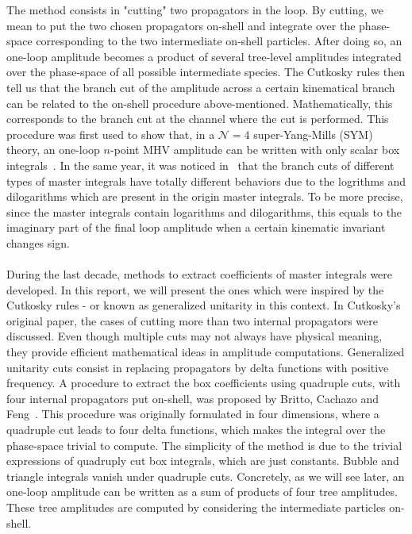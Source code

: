 The method consists in "cutting" two propagators in the loop.
By cutting, we mean to put the two chosen propagators on-shell and integrate over the phase-space corresponding to the two intermediate on-shell particles. 
After doing so, an one-loop amplitude becomes a product of several tree-level amplitudes integrated over the phase-space of all possible intermediate species.
The Cutkosky rules then tell us that the branch cut of the amplitude across a certain kinematical branch can be related to the on-shell procedure above-mentioned.
Mathematically, this corresponds to the branch cut at the channel where the cut is performed.
This procedure was first used to show that, in a $\mathcal{N}=4$ super-Yang-Mills (SYM) theory, an one-loop $n$-point MHV amplitude can be written with only scalar box integrals~\cite{Bern:1994zx}.
In the same year, it was noticed in~\cite{Bern:1994cg} that the branch cuts of different types of master integrals have totally different behaviors due to the logrithms and dilogarithms which are present in the origin master integrals. 
To be more precise, since the master integrals contain logarithms and dilogarithms, this equals to the imaginary part of the final loop amplitude when a certain kinematic invariant changes sign.
\\\\
During the last decade, methods to extract coefficients of master integrals were developed.
In this report, we will present the ones which were inspired by the Cutkosky rules - or known as generalized unitarity in this context.
In Cutkosky's original paper, the cases of cutting more than two internal propagators were discussed.
Even though multiple cuts may not always have physical meaning, they provide efficient mathematical ideas in amplitude computations.
Generalized unitarity cuts consist in replacing propagators by delta functions with positive frequency.
A procedure to extract the box coefficients using quadruple cuts, \ie with four internal propagators put on-shell, was proposed by Britto, Cachazo and Feng~\cite{Britto:2004nc}. 
This procedure was originally formulated in four dimensions, where a quadruple cut leads to four delta functions, which makes the integral over the phase-space trivial to compute. 
The simplicity of the method is due to the trivial expressions of quadruply cut box integrals, which are just constants.
Bubble and triangle integrals vanish under quadruple cuts.
Concretely, as we will see later, an one-loop amplitude can be written as a sum of products of four tree amplitudes.
These tree amplitudes are computed by considering the intermediate particles on-shell.
